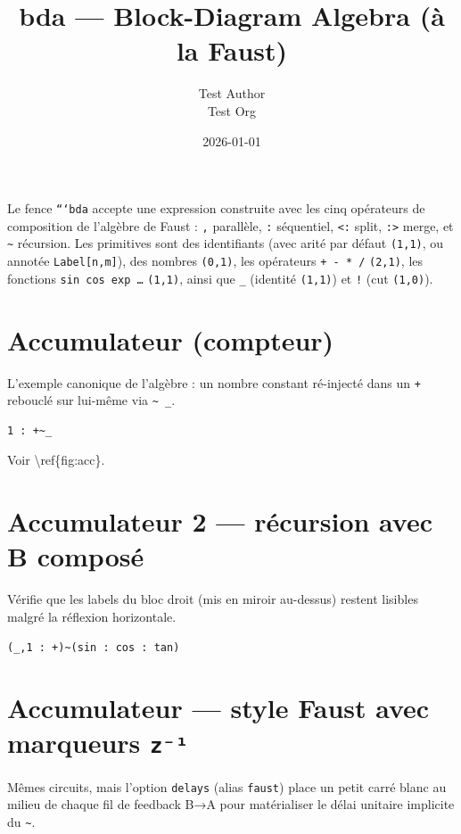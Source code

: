 \documentclass[11pt,a4paper]{article}
\title{bda — Block-Diagram Algebra (à la Faust)}
\author{Test Author \\ Test Org}
\date{2026-01-01}
\theoremstyle{definition}
\begin{document}
\maketitle

Le fence \texttt{```bda} accepte une expression construite avec les cinq
opérateurs de composition de l'algèbre de Faust : \texttt{,} parallèle, \texttt{:}
séquentiel, \texttt{<:} split, \texttt{:>} merge, et \texttt{\textasciitilde{}} récursion. Les primitives
sont des identifiants (avec arité par défaut \texttt{(1,1)}, ou annotée
\texttt{Label[n,m]}), des nombres \texttt{(0,1)}, les opérateurs \texttt{+ - * /} \texttt{(2,1)},
les fonctions \texttt{sin cos exp …} \texttt{(1,1)}, ainsi que \texttt{\_} (identité \texttt{(1,1)})
et \texttt{!} (cut \texttt{(1,0)}).


\section{Accumulateur (compteur)}

L'exemple canonique de l'algèbre : un nombre constant ré-injecté dans
un \texttt{+} rebouclé sur lui-même via \texttt{\textasciitilde{} \_}.


\begin{lstlisting}
1 : +~_
\end{lstlisting}


Voir \textbackslash{}ref\{fig:acc\}.


\section{Accumulateur 2 — récursion avec B composé}

Vérifie que les labels du bloc droit (mis en miroir au-dessus) restent
lisibles malgré la réflexion horizontale.


\begin{lstlisting}
(_,1 : +)~(sin : cos : tan)
\end{lstlisting}


\section{Accumulateur — style Faust avec marqueurs \texttt{z⁻¹}}

Mêmes circuits, mais l'option \texttt{delays} (alias \texttt{faust}) place un petit
carré blanc au milieu de chaque fil de feedback B→A pour matérialiser le
délai unitaire implicite du \texttt{\textasciitilde{}}.
\end{document}

